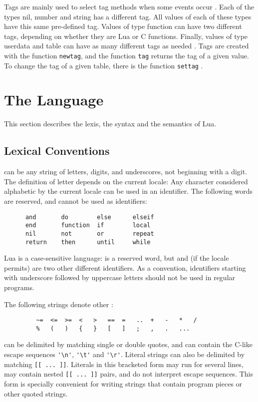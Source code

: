 Tags are mainly used to select tag methods when
some events occur .
Each of the types nil, number and string has a different tag.
All values of each of these types have this same pre-defined tag.
Values of type function can have two different tags,
depending on whether they are Lua or C functions.
Finally,
values of type userdata and table can have
as many different tags as needed .
Tags are created with the function \verb|newtag|,
and the function \verb|tag| returns the tag of a given value.
To change the tag of a given table,
there is the function \verb|settag| .


\section{The Language}

This section describes the lexis, the syntax and the semantics of Lua.


\subsection{Lexical Conventions} \label{lexical}

 can be any string of letters, digits, and underscores,
not beginning with a digit.
The definition of letter depends on the current locale:
Any character considered alphabetic by the current locale
can be used in an identifier.
The following words are reserved, and cannot be used as identifiers:
\begin{verbatim}
      and       do        else      elseif
      end       function  if        local
      nil       not       or        repeat
      return    then      until     while
\end{verbatim}
Lua is a case-sensitive language:
 is a reserved word, but  and 
(if the locale permits) are two other different identifiers.
As a convention, identifiers starting with underscore followed by
uppercase letters should not be used in regular programs.

The following strings denote other :
\begin{verbatim}
         ~=  <=  >=  <   >   ==  =   ..  +   -   *   /
         %   (   )   {   }   [   ]   ;   ,   .   ...
\end{verbatim}

 can be delimited by matching single or double quotes,
and can contain the C-like escape sequences
\verb|'\n'|, \verb|'\t'| and \verb|'\r'|.
Literal strings can also be delimited by matching \verb|[[ ... ]]|.
Literals in this bracketed form may run for several lines,
may contain nested \verb|[[ ... ]]| pairs,
and do not interpret escape sequences.
This form is specially convenient for
writing strings that contain program pieces or
other quoted strings.

